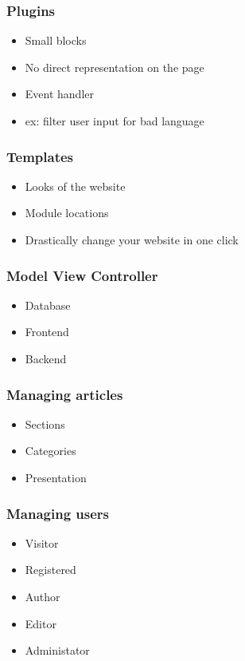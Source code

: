 \begin{frame}
\frametitle{Plugins}
  \begin{itemize}[<+->]
    \item Small blocks
    \item No direct representation on the page
    \item Event handler
    \item ex: filter user input for bad language
  \end{itemize}
\end{frame}


\begin{frame}
\frametitle{Templates}
  \begin{itemize}[<+->]
    \item Looks of the website
    \item Module locations
    \item Drastically change your website in one click
  \end{itemize}
\end{frame}

\begin{frame}
\frametitle{Model View Controller}
  \begin{itemize}[<+->]
    \item Database
    \item Frontend
    \item Backend
  \end{itemize}
\end{frame}


\begin{frame}
\frametitle{Managing articles}
  \begin{itemize}[<+->]
    \item Sections
    \item Categories
    \item Presentation
  \end{itemize}
\end{frame}

\begin{frame}
\frametitle{Managing users}
  \begin{itemize}[<+->]
    \item Visitor
    \item Registered
    \item Author
    \item Editor
    \item Administator
  \end{itemize}
\end{frame}


